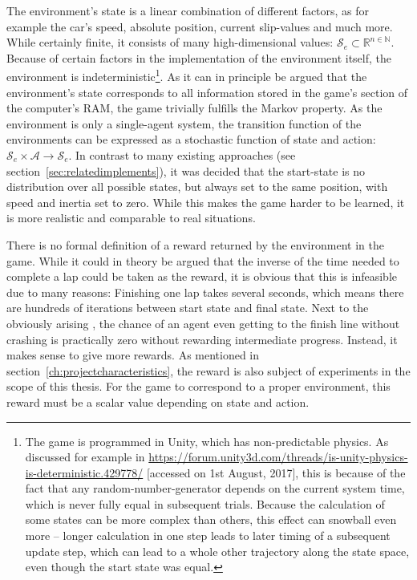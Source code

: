 The environment's state is a linear combination of different factors, as for example the car's speed, absolute position, current slip-values and much more. While certainly finite, it consists of many high-dimensional values: $\mathcal{S}_e \subset \mathds{R}^{n \in \mathds{N}}$. Because of certain factors in the implementation of the environment itself, the environment is indeterministic\footnote{The game is programmed in Unity, which has non-predictable physics. As discussed for example in \url{https://forum.unity3d.com/threads/is-unity-physics-is-deterministic.429778/} [accessed on 1st August, 2017], this is because of the fact that any random-number-generator depends on the current system time, which is never fully equal in subsequent trials. Because the calculation of some states can be more complex than others, this effect can snowball even more -- longer calculation in one step leads to later timing of a subsequent update step, which can lead to a whole other trajectory along the state space, even though the start state was equal.}. As it can in principle be argued that the environment's state corresponds to all information stored in the game's section of the computer's RAM, the game trivially fulfills the Markov property. As the environment is only a single-agent system, the transition function of the environments can be expressed as a stochastic function of state and action: $\mathcal{S}_e \times \mathcal{A} \rightarrow \mathcal{S}_e$. 
In contrast to many existing approaches (see section~\ref{sec:relatedimplements}), it was decided that the start-state is no distribution over all possible states, but always set to the same position, with speed and inertia set to zero. While this makes the game harder to be learned, it is more realistic and comparable to real situations.

There is no formal definition of a reward returned by the environment in the game. While it could in theory be argued that the inverse of the time needed to complete a lap could be taken as the reward, it is obvious that this is infeasible due to many reasons: Finishing one lap takes several seconds, which means there are hundreds of iterations between start state and final state. Next to the obviously arising , the chance of an agent even getting to the finish line without crashing is practically zero without rewarding intermediate progress. Instead, it makes sense to give more  rewards. As mentioned in section~\ref{ch:projectcharacteristics}, the reward is also subject of experiments in the scope of this thesis. For the game to correspond to a proper environment, this reward must be a scalar value depending on state and action.

